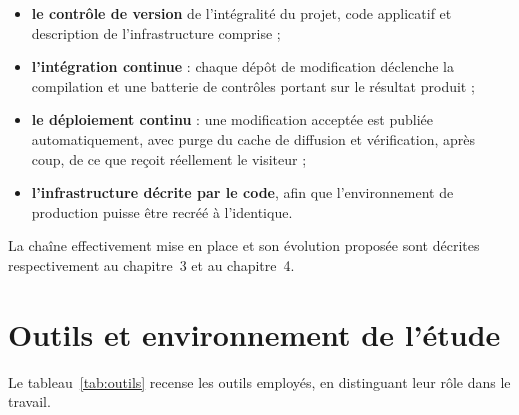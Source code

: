 \begin{itemize}
  \item \textbf{le contrôle de version} de l'intégralité du projet, code
        applicatif et description de l'infrastructure comprise ;
  \item \textbf{l'intégration continue} : chaque dépôt de modification déclenche
        la compilation et une batterie de contrôles portant sur le résultat
        produit ;
  \item \textbf{le déploiement continu} : une modification acceptée est publiée
        automatiquement, avec purge du cache de diffusion et vérification, après
        coup, de ce que reçoit réellement le visiteur ;
  \item \textbf{l'infrastructure décrite par le code}, afin que l'environnement
        de production puisse être recréé à l'identique.
\end{itemize}

La chaîne effectivement mise en place et son évolution proposée sont décrites
respectivement au chapitre~3 et au chapitre~4.

\section{Outils et environnement de l'étude}
\label{sec:outilsetude}

Le tableau~\ref{tab:outils} recense les outils employés, en distinguant leur
rôle dans le travail.

